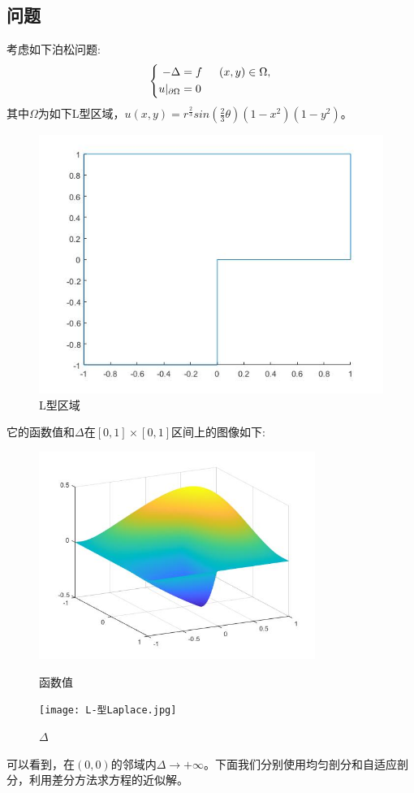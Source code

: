 \documentclass[12pt,fontset=mac]{ctexart}
\begin{document}
\subsection{问题}
考虑如下泊松问题:
$$
\left\{\begin{aligned}
-\Delta&=f\indent (x,y)\in \Omega,\\
u|_{\partial\Omega}&=0
\end{aligned}
\right.
$$
\noindent 其中$\Omega$为如下L型区域，$u(x,y)=r^{\frac{2}{3}}sin(\frac{2}{3}\theta)(1-x^2)(1-y^2)$。\\
\begin{figure}[H]
	\centering
	\includegraphics[width=12cm]{L-shaped.jpg}
	\caption{L型区域}
\end{figure}
\noindent 它的函数值和$\Delta$在$[0,1]\times[0,1]$区间上的图像如下:\\
\begin{figure}[H]
	\centering
	\begin{minipage}[t]{0.48\textwidth}
		\centering
		\includegraphics[width=9cm]{L-型函数.jpg}
		\caption{函数值}
	\end{minipage}
	\begin{minipage}[t]{0.48\textwidth}
		\centering
		\texttt{[image: L-型Laplace.jpg]}
		\caption{$\Delta$}
	\end{minipage}
\end{figure}
\noindent 可以看到，在$(0,0)$的邻域内$\Delta\to +\infty$。下面我们分别使用均匀剖分和自适应剖分，利用差分方法求方程的近似解。
\end{document}
